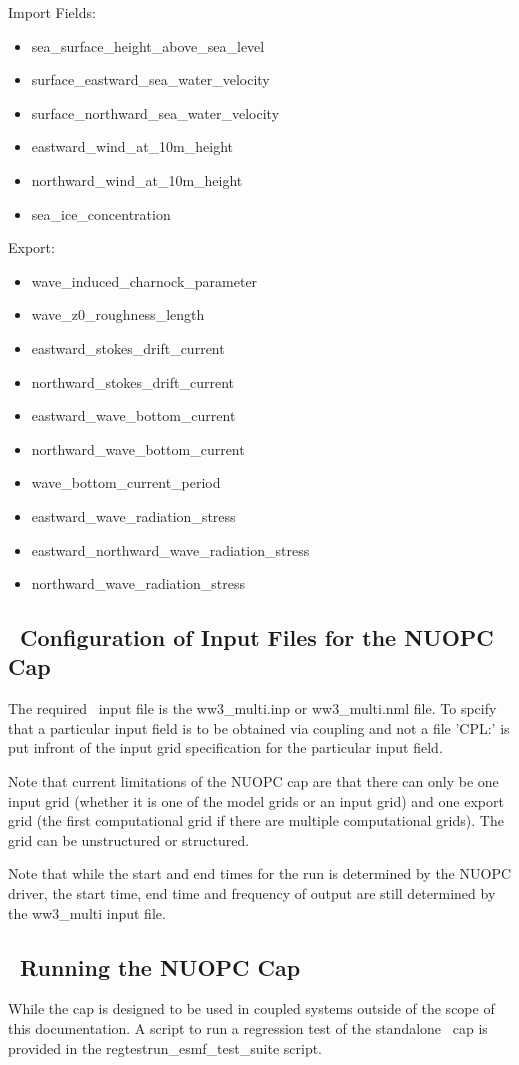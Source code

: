 \noindent Import Fields:
\begin{itemize} 
\item sea\_surface\_height\_above\_sea\_level
\item surface\_eastward\_sea\_water\_velocity
\item surface\_northward\_sea\_water\_velocity
\item eastward\_wind\_at\_10m\_height
\item northward\_wind\_at\_10m\_height
\item sea\_ice\_concentration
\end{itemize}

\noindent Export: 
\begin{itemize}
\item wave\_induced\_charnock\_parameter
\item wave\_z0\_roughness\_length
\item eastward\_stokes\_drift\_current
\item northward\_stokes\_drift\_current
\item eastward\_wave\_bottom\_current
\item northward\_wave\_bottom\_current
\item wave\_bottom\_current\_period
\item eastward\_wave\_radiation\_stress
\item eastward\_northward\_wave\_radiation\_stress
\item northward\_wave\_radiation\_stress
\end{itemize}


\vssub
\subsection{~Configuration of Input Files for the NUOPC Cap} \label{sec:nuopcconfig}
\vssub

The required \ws\ input file is the ww3\_multi.inp or ww3\_multi.nml file.  To spcify that a particular input field 
is to be obtained via coupling and not a file 'CPL:' is put infront of the input grid specification for the 
particular input field.  

Note that current limitations of the NUOPC cap are that there can only be one input grid (whether it is one of the 
model grids or an input grid) and one export grid (the first computational grid if there are multiple computational 
grids). The grid can be unstructured or structured. 

Note that while the start and end times for the run is determined by the NUOPC driver, the start time, end time and 
frequency of output are still determined by the ww3\_multi input file. 

\vssub
\subsection{~Running the NUOPC Cap} \label{sec:nuopcrun}
\vssub

While the cap is designed to be used in coupled systems outside of the scope of this documentation.  
A script to run a regression test of the standalone \ws\ cap is provided in the {\code regtest\/run\_esmf\_test\_suite}
script. 


